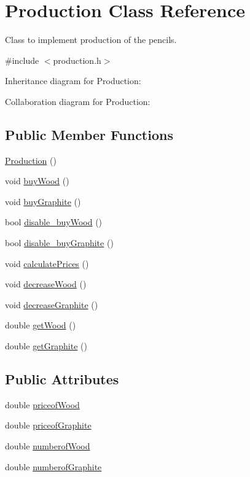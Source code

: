 \hypertarget{classProduction}{}\section{Production Class Reference}
\label{classProduction}


Class to implement production of the pencils.  




{\ttfamily \#include $<$production.\+h$>$}



Inheritance diagram for Production\+:


Collaboration diagram for Production\+:
\subsection*{Public Member Functions}
\begin{DoxyCompactItemize}
\item 
\hyperlink{classProduction_a12c7c685be71ed51ac10f7d0284e8d4f}{Production} ()
\item 
void \hyperlink{classProduction_a5eea7af1f4949832bcc0c019f420d655}{buy\+Wood} ()
\item 
void \hyperlink{classProduction_adf62fb3241254aa3412ed9a9d1fb27a2}{buy\+Graphite} ()
\item 
bool \hyperlink{classProduction_a5f5c38b7f3f7b23f9029d562c7e53025}{disable\+\_\+buy\+Wood} ()
\item 
bool \hyperlink{classProduction_a4c87c63f0fdc741f9185dcda6793463e}{disable\+\_\+buy\+Graphite} ()
\item 
void \hyperlink{classProduction_a4a9bbd94b71b1d24d836d9ad79bed97b}{calculate\+Prices} ()
\item 
void \hyperlink{classProduction_a42c46b93e65cb3f84db76562a27d44f6}{decrease\+Wood} ()
\item 
void \hyperlink{classProduction_aa5180ed4aac0e3d8ecec30596c9b1751}{decrease\+Graphite} ()
\item 
double \hyperlink{classProduction_a8991aa503f8d94ae01ff9b7f08043c58}{get\+Wood} ()
\item 
double \hyperlink{classProduction_ad8e6b675848c58fcf04e214e383a87fd}{get\+Graphite} ()
\end{DoxyCompactItemize}
\subsection*{Public Attributes}
\begin{DoxyCompactItemize}
\item 
double \hyperlink{classProduction_ac6bc16863f128802bebbb52263d5558c}{priceof\+Wood}
\item 
double \hyperlink{classProduction_afca6aca1df88921b60bb7190adab5d51}{priceof\+Graphite}
\item 
double \hyperlink{classProduction_a5d77a106ee08bfb55522cdd28e0d364e}{numberof\+Wood}
\item 
double \hyperlink{classProduction_a3b0d11cefec32eeec83637e1d5252a41}{numberof\+Graphite}
\end{DoxyCompactItemize}


